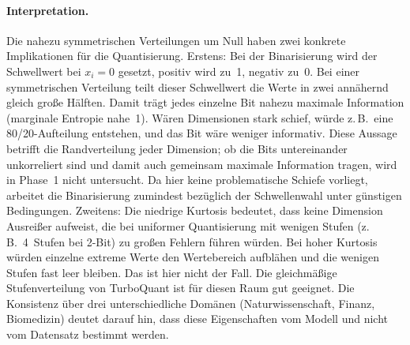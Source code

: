 \paragraph{Interpretation.}
Die nahezu symmetrischen Verteilungen um Null haben zwei konkrete Implikationen für die Quantisierung.
%
Erstens: Bei der Binarisierung wird der Schwellwert bei $x_i = 0$ gesetzt, positiv wird zu~1, negativ zu~0.
Bei einer symmetrischen Verteilung teilt dieser Schwellwert die Werte in zwei annähernd gleich große Hälften.
Damit trägt jedes einzelne Bit nahezu maximale Information (marginale Entropie nahe~1).
Wären Dimensionen stark schief, würde z.\,B.\ eine 80/20-Aufteilung entstehen, und das Bit wäre weniger informativ.
Diese Aussage betrifft die Randverteilung jeder Dimension; ob die Bits untereinander unkorreliert sind und damit auch gemeinsam maximale Information tragen, wird in Phase~1 nicht untersucht.
Da hier keine problematische Schiefe vorliegt, arbeitet die Binarisierung zumindest bezüglich der Schwellenwahl unter günstigen Bedingungen.
%
Zweitens: Die niedrige Kurtosis bedeutet, dass keine Dimension Ausreißer aufweist, die bei uniformer Quantisierung mit wenigen Stufen (z.\,B.\ 4~Stufen bei 2-Bit) zu großen Fehlern führen würden.
Bei hoher Kurtosis würden einzelne extreme Werte den Wertebereich aufblähen und die wenigen Stufen fast leer bleiben.
Das ist hier nicht der Fall. Die gleichmäßige Stufenverteilung von TurboQuant ist für diesen Raum gut geeignet.
%
Die Konsistenz über drei unterschiedliche Domänen (Naturwissenschaft, Finanz, Biomedizin) deutet darauf hin, dass diese Eigenschaften vom Modell und nicht vom Datensatz bestimmt werden.
%
